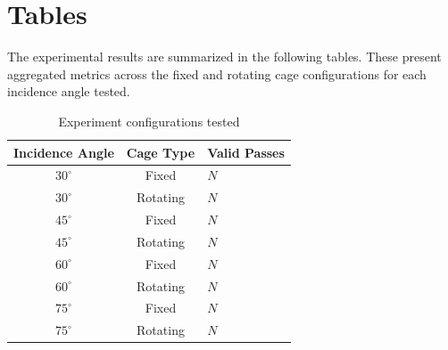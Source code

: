 \clearpage
\section{Tables}

The experimental results are summarized in the following tables. These
present aggregated metrics across the fixed and rotating cage configurations
for each incidence angle tested.

\begin{table}[htbp]
  \centering
  \caption{Experiment configurations tested}
  \label{tab:experiment_configs}
  \begin{tabular}{ccl}
    \toprule
    Incidence Angle & Cage Type & Valid Passes \\
    \midrule
    $30^\circ$ & Fixed & $N$ \\
    $30^\circ$ & Rotating & $N$ \\
    $45^\circ$ & Fixed & $N$ \\
    $45^\circ$ & Rotating & $N$ \\
    $60^\circ$ & Fixed & $N$ \\
    $60^\circ$ & Rotating & $N$ \\
    $75^\circ$ & Fixed & $N$ \\
    $75^\circ$ & Rotating & $N$ \\
    \bottomrule
  \end{tabular}
\end{table}
